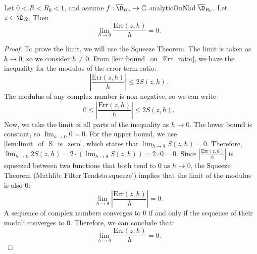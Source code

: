 \begin{lemma}\label{lem:limit_of_Err_ratio_is_zero}
\leanok
Let $0<R<R_0<1$, and assume $f:\overline{\D}_{R_0}\to\mathbb{C}$ analyticOnNhd $\overline{\D}_{R_0}$. Let $z \in \overline{\D}_{R}$. Then
\[ \lim_{h\to 0} \frac{\mathrm{Err}(z,h)}{h} = 0. \]
\end{lemma}
\begin{proof}
\leanok
To prove the limit, we will use the Squeeze Theorem. The limit is taken as $h \to 0$, so we consider $h \neq 0$.
From \cref{lem:bound_on_Err_ratio}, we have the inequality for the modulus of the error term ratio:
\[ \left|\frac{\mathrm{Err}(z,h)}{h}\right| \le 2S(z,h). \]
The modulus of any complex number is non-negative, so we can write:
\[ 0 \le \left|\frac{\mathrm{Err}(z,h)}{h}\right| \le 2S(z,h). \]
Now, we take the limit of all parts of the inequality as $h \to 0$.
The lower bound is constant, so $\lim_{h\to 0} 0 = 0$.
For the upper bound, we use \cref{lem:limit_of_S_is_zero}, which states that $\lim_{h\to 0} S(z,h) = 0$.
Therefore, $\lim_{h\to 0} 2S(z,h) = 2 \cdot \left(\lim_{h\to 0} S(z,h)\right) = 2 \cdot 0 = 0$.
Since $\left|\frac{\mathrm{Err}(z,h)}{h}\right|$ is squeezed between two functions that both tend to 0 as $h \to 0$, the Squeeze Theorem (Mathlib: Filter.Tendsto.squeeze') implies that the limit of the modulus is also 0:
\[ \lim_{h\to 0} \left|\frac{\mathrm{Err}(z,h)}{h}\right| = 0. \]
A sequence of complex numbers converges to 0 if and only if the sequence of their moduli converges to 0. Therefore, we can conclude that:
\[ \lim_{h\to 0} \frac{\mathrm{Err}(z,h)}{h} = 0. \]
\end{proof}

